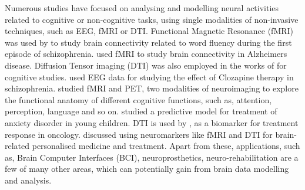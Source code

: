 Numerous studies have focused on analysing and modelling neural activities related to cognitive or non-cognitive tasks, using single modalities of non-invasive techniques, such as EEG, fMRI or DTI. Functional Magnetic Resonance (fMRI) was used by \citet{boksman20054} to study brain connectivity related to word fluency during the first episode of schizophrenia. \citet{supekar2008network} used fMRI to study brain connectivity in Alzheimers disease. Diffusion Tensor imaging (DTI) was also employed in the works of \citet{eluvathingal2006abnormal, price2007abnormal} for cognitive studies. \citet{ravan2015machine} used EEG data for studying the effect of Clozapine therapy in schizophrenia. \citet{cabeza2000imaging} studied fMRI and PET, two modalities of neuroimaging to explore the functional anatomy of different cognitive functions, such as, attention, perception, language and so on. \citet{mcclure2007fmri} studied a predictive model for treatment of anxiety disorder in young children. DTI is used by \citet{hamstra2007diffusion}, as a biomarker for treatment response in oncology. \citet{gordon2007integrating} discussed using neuromarkers like fMRI and DTI for brain-related personalised medicine and treatment. Apart from these, applications, such as, Brain Computer Interfaces (BCI), neuroprosthetics, neuro-rehabilitation are a few of many other areas, which can potentially gain from brain data modelling and analysis. 

